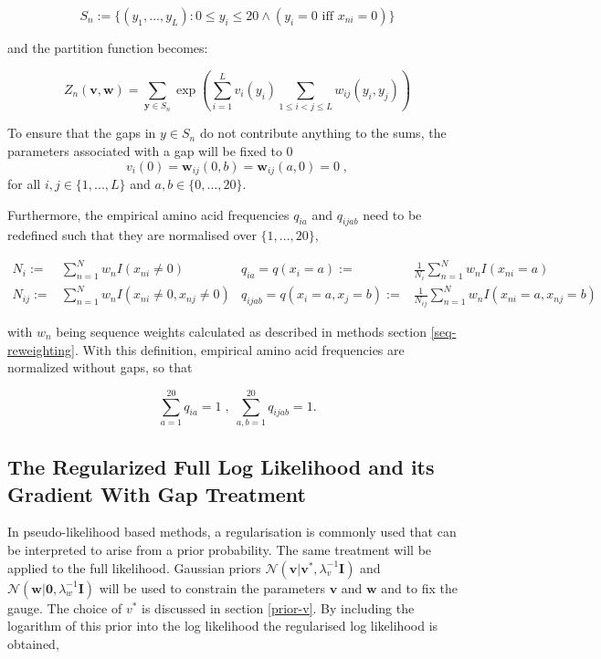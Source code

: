 \documentclass[11pt,a4paper,twoside]{book}
\newcommand{\eq}{\!=\!}
\newcommand{\I}{\mathbf{I}}
\newcommand{\Sn}{S_n}
\renewcommand{\v}{\mathbf{v}}
\newcommand{\vi}{v_{i}}
\newcommand{\w}{\mathbf{w}}
\newcommand{\wij}{\mathbf{w}_{ij}}
\theoremstyle{definition}
\theoremstyle{definition}
\theoremstyle{remark}
\begin{document}
\begin{equation}
\Sn := \{(y_1,... , y_L): 0 \leq y_i \leq 20 \land (y_i \eq 0 \textrm{ iff } x_{ni} \eq 0) \}
\end{equation}

and the partition function becomes:

\begin{equation}
  Z_n(\v, \w) = \sum_{\mathbf{y} \in \Sn} \exp \left( \sum_{i=1}^L v_i(y_i) \sum_{1 \leq i < j \leq L} w_{ij}(y_i, y_j)  \right)
\end{equation}

To ensure that the gaps in \(y \in \Sn\) do not contribute anything to
the sums, the parameters associated with a gap will be fixed to 0 \[
\vi(0) = \wij(0, b) = \wij(a, 0) = 0 \; ,
\] for all \(i, j \in \{1, ..., L\}\) and \(a, b \in \{0, ..., 20\}\).

Furthermore, the empirical amino acid frequencies \(q_{ia}\) and
\(q_{ijab}\) need to be redefined such that they are normalised over
\(\{1, ..., 20\}\),

\begin{align}
   N_i :=& \sum_{n=1}^N  w_n I(x_{ni} \!\ne\! 0) &  q_{ia} = q(x_i \eq a) :=& \frac{1}{N_i} \sum_{n=1}^N w_n I(x_{ni} \eq a)   \\
   N_{ij} :=& \sum_{n=1}^N  w_n I(x_{ni} \!\ne\! 0, x_{nj} \!\ne\! 0)  &  q_{ijab} = q(x_i \eq a, x_j \eq b) :=& \frac{1}{N_{ij}} \sum_{n=1}^N w_n I(x_{ni} \eq a, x_{nj} \eq b)
\end{align}

with \(w_n\) being sequence weights calculated as described in methods
section \ref{seq-reweighting}. With this definition, empirical amino
acid frequencies are normalized without gaps, so that

\begin{equation}
    \sum_{a=1}^{20} q_{ia} = 1      \; , \;     \sum_{a,b=1}^{20} q_{ijab} = 1.
\label{eq:normalized-emp-freq}
\end{equation}

\subsection{The Regularized Full Log Likelihood and its Gradient With
Gap
Treatment}\label{the-regularized-full-log-likelihood-and-its-gradient-with-gap-treatment}

In pseudo-likelihood based methods, a regularisation is commonly used
that can be interpreted to arise from a prior probability. The same
treatment will be applied to the full likelihood. Gaussian priors
\(\mathcal{N}( \v | \v^*, \lambda_v^{-1} \I)\) and
\(\mathcal{N}( \w |\boldsymbol 0, \lambda_w^{-1} \I)\) will be used to
constrain the parameters \(\v\) and \(\w\) and to fix the gauge. The
choice of \(v^*\) is discussed in section \ref{prior-v}. By including
the logarithm of this prior into the log likelihood the regularised log
likelihood is obtained,
\end{document}
